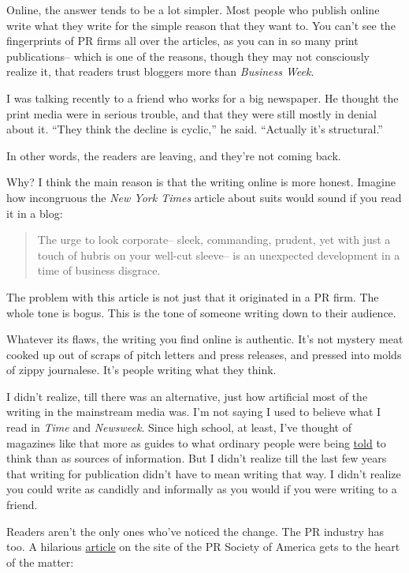 Online, the answer tends to be a lot simpler. Most people who publish
online write what they write for the simple reason that they want to.
You can't see the fingerprints of PR firms all over the articles, as you
can in so many print publications-- which is one of the reasons, though
they may not consciously realize it, that readers trust bloggers more
than \emph{Business Week}.

I was talking recently to a friend who works for a big newspaper. He
thought the print media were in serious trouble, and that they were
still mostly in denial about it. ``They think the decline is cyclic,''
he said. ``Actually it's structural.''

In other words, the readers are leaving, and they're not coming back.

Why? I think the main reason is that the writing online is more honest.
Imagine how incongruous the \emph{New York Times} article about suits
would sound if you read it in a blog:

\begin{quote}
The urge to look corporate-- sleek, commanding, prudent, yet with just a
touch of hubris on your well-cut sleeve-- is an unexpected development
in a time of business disgrace.
\end{quote}

The problem with this article is not just that it originated in a PR
firm. The whole tone is bogus. This is the tone of someone writing down
to their audience.

Whatever its flaws, the writing you find online is authentic. It's not
mystery meat cooked up out of scraps of pitch letters and press
releases, and pressed into molds of zippy journalese. It's people
writing what they think.

I didn't realize, till there was an alternative, just how artificial
most of the writing in the mainstream media was. I'm not saying I used
to believe what I read in \emph{Time} and \emph{Newsweek}. Since high
school, at least, I've thought of magazines like that more as guides to
what ordinary people were being \href{say.html}{told} to think than as
sources of information. But I didn't realize till the last few years
that writing for publication didn't have to mean writing that way. I
didn't realize you could write as candidly and informally as you would
if you were writing to a friend.

Readers aren't the only ones who've noticed the change. The PR industry
has too. A hilarious
\href{http://www.prsa.org/_Publications/magazines/0802news1.asp}{article}
on the site of the PR Society of America gets to the heart of the
matter:

